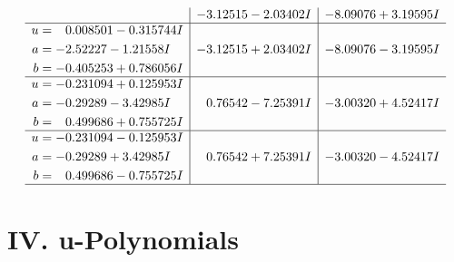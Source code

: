 \documentclass[1p]{elsarticle_modified}
\theoremstyle{definition}
\begin{document}
$$\begin{array}{c|c|c}
 & -3.12515 - 2.03402 I & -8.09076 + 3.19595 I \\ \hline\begin{aligned}
u &= \phantom{-}0.008501 - 0.315744 I \\
a &= -2.52227 - 1.21558 I \\
b &= -0.405253 + 0.786056 I\end{aligned}
 & -3.12515 + 2.03402 I & -8.09076 - 3.19595 I \\ \hline\begin{aligned}
u &= -0.231094 + 0.125953 I \\
a &= -0.29289 - 3.42985 I \\
b &= \phantom{-}0.499686 + 0.755725 I\end{aligned}
 & \phantom{-}0.76542 - 7.25391 I & -3.00320 + 4.52417 I \\ \hline\begin{aligned}
u &= -0.231094 - 0.125953 I \\
a &= -0.29289 + 3.42985 I \\
b &= \phantom{-}0.499686 - 0.755725 I\end{aligned}
 & \phantom{-}0.76542 + 7.25391 I & -3.00320 - 4.52417 I\\
 \hline 
 \end{array}$$\newpage
\newpage\renewcommand{\arraystretch}{1}
\centering \section*{ IV. u-Polynomials}
\end{document}
